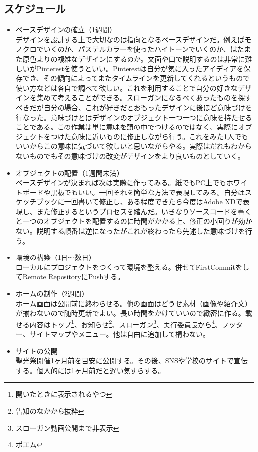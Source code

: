\documentclass[dvipdfmx,jb5]{jarticle}
\begin{document}
 \subsection{スケジュール}
 \begin{itemize}
 \item ベースデザインの確立（1週間）\\
 デザインを設計する上で大切なのは指向となるベースデザインだ。例えばモノクロでいくのか、パステルカラーを使ったハイトーンでいくのか、はたまた原色よりの複雑なデザインにするのか。文面や口で説明するのは非常に難しいがPinterestを使うといい。Pinterestは自分が気に入ったアイディアを保存でき、その傾向によってまたタイムラインを更新してくれるというもので使い方などは各自で調べて欲しい。これを利用することで自分の好きなデザインを集めて考えることができる。スローガンになるべくあったものを探すべきだが自分の場合、これが好きだとおもったデザインに後ほど意味づけを行なった。意味づけとはデザインのオブジェクト一つ一つに意味を持たせることである。この作業は単に意味を頭の中でつけるのではなく、実際にオブジェクトをつけた意味に近いものに修正しながら行う。これをみた1人でもいいからこの意味に気づいて欲しいと思いながらやる。実際はだれもわからないものでもその意味づけの改変がデザインをより良いものとしていく。
 \item オブジェクトの配置（1週間未満）\\
 ベースデザインが決まれば次は実際に作ってみる。紙でもPC上でもホワイトボードや黒板でもいい。一回それを簡単な方法で表現してみる。自分はスケッチブックに一回書いて修正し、ある程度できたら今度はAdobe XDで表現し、また修正するというプロセスを踏んだ。いきなりソースコードを書くと一つのオブジェクトを配置するのに時間がかかる上、修正の小回りが効かない。説明する順番は逆になったがこれが終わったら先述した意味づけを行う。
 \item 環境の構築（1日〜数日）\\
 ローカルにプロジェクトをつくって環境を整える。併せてFirstCommitをしてRemote RepositoryにPushする。
  \item ホームの制作（2週間）\\
  ホーム画面は公開前に終わらせる。他の画面はどうせ素材（画像や紹介文）が揃わないので随時更新でよい。長い時間をかけていいので緻密に作る。載せる内容はトップ\footnote{開いたときに表示されるやつ}、お知らせ\footnote{告知のなかから抜粋}、スローガン\footnote{スローガン動画公開まで非表示}、実行委員長から\footnote{ポエム}、フッター、サイトマップやメニュー。他は自由に追加して構わない。
  \item サイトの公開\\
  聖光祭開催1ヶ月前を目安に公開する。その後、SNSや学校のサイトで宣伝する。個人的には1ヶ月前だと遅い気すらする。

\end{itemize}
\end{document}
